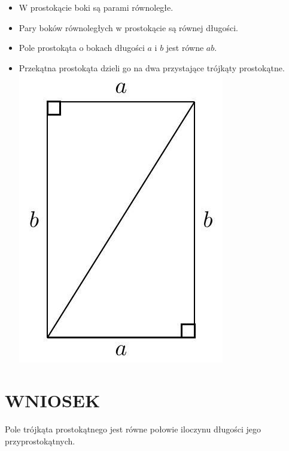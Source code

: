 \documentclass[10pt]{article}
\begin{document}
\begin{itemize}
  \item W prostokącie boki są parami równoległe.
  \item Pary boków równoległych w prostokącie są równej długości.
  \item Pole prostokąta o bokach długości \(a\) i \(b\) jest równe \(a b\).
  \item Przekątna prostokąta dzieli go na dwa przystające trójkąty prostokątne.\\
\includegraphics[max width=\textwidth, center]{2024_11_21_8f01584889ff06348ae7g-194(2)}
\end{itemize}

\section*{WNIOSEK}
Pole trójkąta prostokątnego jest równe połowie iloczynu długości jego przyprostokątnych.
\end{document}
